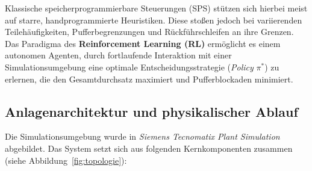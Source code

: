 \documentclass[11pt,a4paper]{article}
\begin{document}
Klassische speicherprogrammierbare Steuerungen (SPS) stützen sich hierbei meist auf starre, handprogrammierte Heuristiken. Diese stoßen jedoch bei variierenden Teilehäufigkeiten, Pufferbegrenzungen und Rückführschleifen an ihre Grenzen. Das Paradigma des \textbf{Reinforcement Learning (RL)} ermöglicht es einem autonomen Agenten, durch fortlaufende Interaktion mit einer Simulationsumgebung eine optimale Entscheidungsstrategie (\textit{Policy} $\pi^*$) zu erlernen, die den Gesamtdurchsatz maximiert und Pufferblockaden minimiert.

\subsection{Anlagenarchitektur und physikalischer Ablauf}
Die Simulationsumgebung wurde in \textit{Siemens Tecnomatix Plant Simulation} abgebildet. Das System setzt sich aus folgenden Kernkomponenten zusammen (siehe Abbildung~\ref{fig:topologie}):
\end{document}
